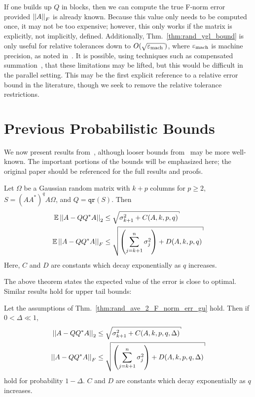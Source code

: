 \noindent
If one builds up $Q$ in blocks, then we can compute the true F-norm error
provided $\left| \left| A \right| \right|_{F}$ is already known.
Because this value only needs to be computed once, it may not 
be too expensive;
however, this only works if the matrix is explicitly, not implicitly, defined.
Additionally, Thm.~\ref{thm:rand_ygl_bound} is only useful
for relative tolerances down to $O(\sqrt{\epsm})$,
where $\varepsilon_{\text{mach}}$ is machine precision,
as noted in~\cite[Theorem 3]{yu2018efficient}.
It is possible, using techniques such as compensated
summation~\cite[Chapter 4]{HighamASNA}, that these limitations may be
lifted, but this would be difficult in the parallel setting.
This may be the first explicit reference to a relative error bound
in the literature, though we seek to remove the relative tolerance restrictions.



\section{Previous Probabilistic Bounds}

We now present results from~\cite{gu2015subspace}, although
looser bounds from~\cite{RandomReview2011} may be more well-known.
The important portions of the bounds will be emphasized here;
the original paper should be referenced for the full results and proofs.

\begin{thm}
\label{thm:rand_ave_2_F_norm_err_gu}
Let $\Omega$ be a Gaussian random matrix with $k+p$ columns for
$p\ge2$, $S = (AA^{*})^{q}A\Omega$, and $Q = \texttt{qr}(S)$.
Then
%
\begin{align}
    \E\norm{A-QQ^{*}A}_{2} &\le
        \sqrt{\sigma_{k+1}^{2} + C(A,k,p,q)} \nonumber\\
    \E\norm{A-QQ^{*}A}_{F} &\le
        \sqrt{\parens{\sum_{j=k+1}^{n}\sigma_{j}^{2}} + D(A,k,p,q)}
\end{align}
%
Here, $C$ and $D$ are constants which decay exponentially as $q$ increases.
\end{thm}

\noindent
The above theorem states the expected value of the error is close to optimal.
Similar results hold for upper tail bounds:

\begin{thm}
Let the assumptions of Thm.~\ref{thm:rand_ave_2_F_norm_err_gu} hold.
Then if $0<\Delta\ll1$,
%
\begin{align}
    \norm{A-QQ^{*}A}_{2} &\le
        \sqrt{\sigma_{k+1}^{2} + C(A,k,p,q,\Delta)} \nonumber\\
    \norm{A-QQ^{*}A}_{F} &\le
        \sqrt{\parens{\sum_{j=k+1}^{n}\sigma_{j}^{2}} + D(A,k,p,q,\Delta)}
\end{align}
%
hold for probability $1-\Delta$.
$C$ and $D$ are constants which decay exponentially as $q$ increases.
\end{thm}

